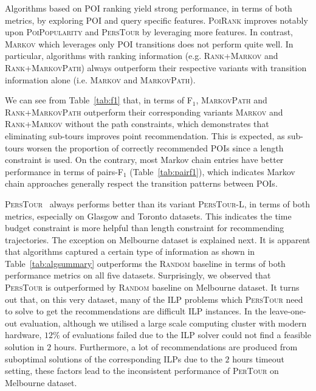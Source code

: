 Algorithms based on POI ranking yield strong performance, in terms of both metrics, by exploring POI and query specific features.
\textsc{PoiRank} improves notably upon \textsc{PoiPopularity} and \textsc{PersTour} by leveraging more features. %
In contrast, \textsc{Markov} which leverages only POI transitions does not perform quite well.
In particular, algorithms with ranking information (e.g. \textsc{Rank+Markov} and \textsc{Rank+MarkovPath}) 
always outperform their respective variants with transition information alone (i.e. \textsc{Markov} and \textsc{MarkovPath}).


We can see from Table~\ref{tab:f1} that, in terms of F$_1$, \textsc{MarkovPath} and \textsc{Rank+MarkovPath}
outperform their corresponding variants \textsc{Markov} and \textsc{Rank+Markov} without the path constraints,
which demonstrates that eliminating sub-tours improves point recommendation.
This is expected, as sub-tours worsen the proportion of correctly recommended POIs since a length constraint is used.
On the contrary, most Markov chain entries have better performance in terms of pairs-F$_1$ (Table~\ref{tab:pairf1}), %
which indicates %
Markov chain approaches generally respect the transition patterns between POIs.


\textsc{PersTour}~\cite{ijcai15} always performs better than its variant \textsc{PersTour-L},
in terms of both metrics, especially on Glasgow and Toronto datasets.
This indicates the time budget constraint is more helpful than length constraint for recommending trajectories.
The exception on Melbourne dataset is explained next.
It is apparent that algorithms captured a certain type of information as shown in Table~\ref{tab:algsummary}
outperforms the \textsc{Random} baseline in terms of both performance metrics on all five datasets.
Surprisingly, we observed that \textsc{PersTour} is outperformed by \textsc{Random} baseline on Melbourne dataset. %
It turns out that, on this very dataset, many of the ILP problems
which \textsc{PersTour} need to solve to get the recommendations are difficult ILP instances.
In the leave-one-out evaluation, although we utilised a large scale computing cluster with modern hardware,
$12\%$ of evaluations failed due to the ILP solver could not find a feasible solution in $2$ hours.
Furthermore, a lot of recommendations are produced from suboptimal solutions of the corresponding ILPs due to
the $2$ hours timeout setting, these factors lead to the inconsistent performance of \textsc{PerTour} on Melbourne dataset.



